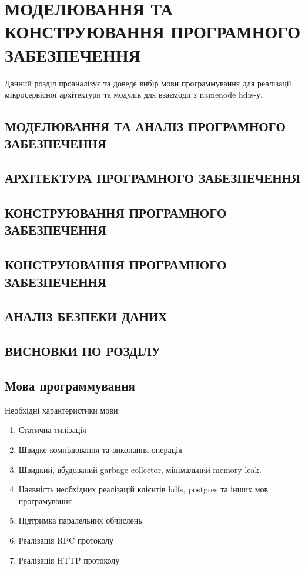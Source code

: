 
\chapter{МОДЕЛЮВАННЯ ТА КОНСТРУЮВАННЯ ПРОГРАМНОГО ЗАБЕЗПЕЧЕННЯ}

Данний розділ проаналізує та доведе вибір мови программування для реалізації мікросервісної архітектури 
та модулів для взаємодії з namenode hdfs-у.

\section{МОДЕЛЮВАННЯ ТА АНАЛІЗ ПРОГРАМНОГО ЗАБЕЗПЕЧЕННЯ}
\section{АРХІТЕКТУРА ПРОГРАМНОГО ЗАБЕЗПЕЧЕННЯ}
\section{КОНСТРУЮВАННЯ ПРОГРАМНОГО ЗАБЕЗПЕЧЕННЯ}
\section{КОНСТРУЮВАННЯ ПРОГРАМНОГО ЗАБЕЗПЕЧЕННЯ}
\section{АНАЛІЗ БЕЗПЕКИ ДАНИХ}
\section{ВИСНОВКИ ПО РОЗДІЛУ}

\section{Мова программування}

Необхідні характеристики мови:

\begin{enumerate}
    \item Статична типізація
    \item Швидке компілювання та виконання операція
    \item Швидкий, вбудований garbage collector, мінімальний memory leak.
    \item Наявність необхідних реалізацій клієнтів hdfs, postgres та інших мов програмування.
    \item Підтримка паралельних обчислень
    \item Реалізація RPC протоколу
    \item Реалізація HTTP протоколу
\end{enumerate}

